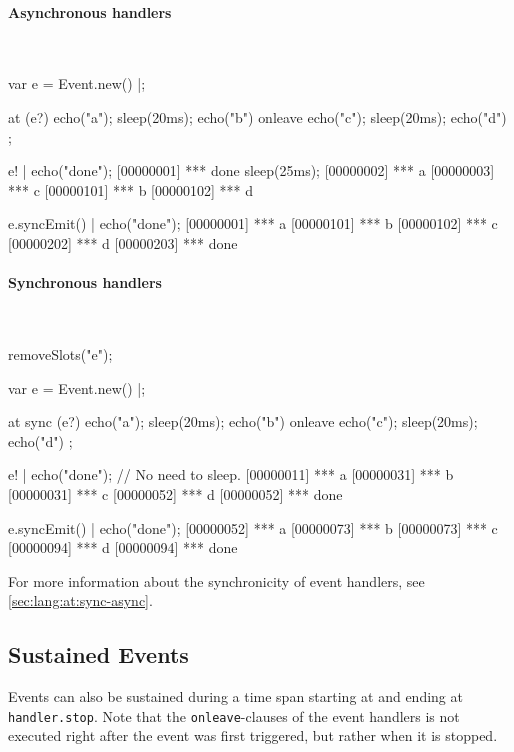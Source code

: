 \begin{multicols}{2}
\paragraph{Asynchronous handlers}~

\begin{urbiscript}[xrightmargin=0mm,xleftmargin=0mm]
var e = Event.new() |;

at (e?)
  { echo("a"); sleep(20ms); echo("b") }
onleave
  { echo("c"); sleep(20ms); echo("d") };

e! | echo("done");
[00000001] *** done
sleep(25ms);
[00000002] *** a
[00000003] *** c
[00000101] *** b
[00000102] *** d

e.syncEmit() | echo("done");
[00000001] *** a
[00000101] *** b
[00000102] *** c
[00000202] *** d
[00000203] *** done
\end{urbiscript}
\columnbreak

\paragraph{Synchronous handlers}~

\begin{urbicomment}
removeSlots("e");
\end{urbicomment}
\begin{urbiscript}[xrightmargin=0mm,xleftmargin=0mm]
var e = Event.new() |;

at sync (e?)
  { echo("a"); sleep(20ms); echo("b") }
onleave
  { echo("c"); sleep(20ms); echo("d") };

e! | echo("done");
// No need to sleep.
[00000011] *** a
[00000031] *** b
[00000031] *** c
[00000052] *** d
[00000052] *** done

e.syncEmit() | echo("done");
[00000052] *** a
[00000073] *** b
[00000073] *** c
[00000094] *** d
[00000094] *** done
\end{urbiscript}
\end{multicols}

For more information about the synchronicity of event handlers, see
\autoref{sec:lang:at:sync-async}.

\subsection{Sustained Events}
\label{sec:event:sustain}

Events can also be sustained during a time span starting at
 and ending at \lstinline|handler.stop|.  Note that the
\lstinline|onleave|-clauses of the event handlers is not executed right
after the event was first triggered, but rather when it is stopped.

